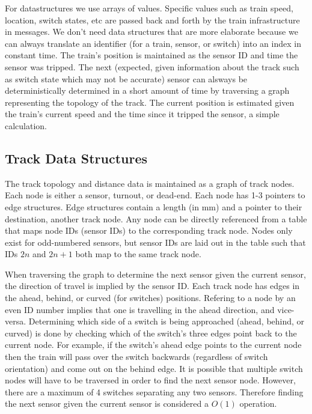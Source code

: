 \documentclass{article}
\begin{document}
For datastructures we use arrays of values. Specific values such as train
speed, location, switch states, etc are passed back and forth by the train
infrastructure in messages. We don't need data structures that are more
elaborate because we can always translate an identifier (for a train, sensor, or
switch) into an index in constant time. The train's position is maintained as
the sensor ID and time the sensor was tripped. The next (expected, given
information about the track such as switch state which may not be accurate)
sensor can alsways be deterministically determined in a short amount of time
by traversing a graph representing the topology of the track. The current
position is estimated given the train's current speed and the time since it
tripped the sensor, a simple calculation.

\subsection{Track Data Structures}
The track topology and distance data is maintained as a graph of track nodes.
Each node is either a sensor, turnout, or dead-end. Each node has 1-3 pointers
to edge structures. Edge structures contain a length (in mm) and a pointer to
their destination, another track node. Any node can be directly referenced from
a table that maps node IDs (sensor IDs) to the corresponding track node. Nodes
only exist for odd-numbered sensors, but sensor IDs are laid out in the table
such that IDs $2n$ and $2n + 1$ both map to the same track node.

When traversing the graph to determine the next sensor given the current sensor,
the direction of travel is implied by the sensor ID. Each track node has edges
in the ahead, behind, or curved (for switches) positions. Refering to a node by
an even ID number implies that one is travelling in the ahead direction, and
vice-versa. Determining which side of a switch is being approached (ahead,
behind, or curved) is done by checking which of the switch's three edges point
back to the current node. For example, if the switch's ahead edge points to the
current node then the train will pass over the switch backwards (regardless of
switch orientation) and come out on the behind edge. It is possible that
multiple switch nodes will have to be traversed in order to find the next sensor
node. However, there are a maximum of 4 switches separating any two sensors.
Therefore finding the next sensor given the current sensor is considered a
$O(1)$ operation.
\end{document}
